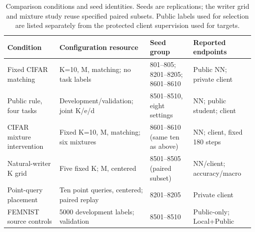 \begin{table}[t]
\caption{Comparison conditions and seed identities. Seeds are replications; the writer grid and mixture study reuse specified paired subsets. Public labels used for selection are listed separately from the protected client supervision used for targets.}
\label{tab:study-map}\small
\centering
\begin{tabular}{@{}llll@{}}\toprule
Condition & Configuration resource & Seed group & Reported endpoints \\
\midrule
Fixed CIFAR matching & K=10, M, matching; no task labels & 801--805; 8201--8205; 8601--8610 & Public NN; private client \\
Public rule, four tasks & Development/validation; joint K/e/d & 8501--8510, eight settings & NN; public student; client \\
CIFAR mixture intervention & Fixed K=10, M, matching; six mixtures & 8601--8610 (same ten as above) & NN; client, fixed 180 steps \\
Natural-writer K grid & Five fixed K; M, centered & 8501--8505 (paired subset) & NN/client; accuracy/macro \\
Point-query placement & Ten point queries, centered; paired replay & 8201--8205 & Private client \\
FEMNIST source controls & 5000 development labels; validation & 8501--8510 & Public-only; Local+Public \\
\bottomrule\end{tabular}
\end{table}
